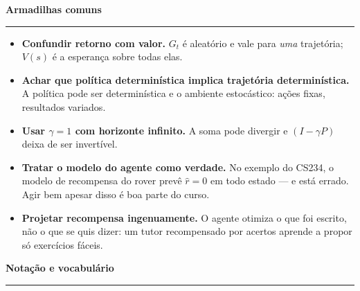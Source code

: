 \documentclass[10pt, a4paper]{article}
\newcounter{secao}
\newcommand{\secao}[1]{%
  \stepcounter{secao}%
  \vspace{0.7em}%
  \noindent{\color{rlLaranja}\rule{1.6em}{2pt}}\hspace{0.5em}%
  {\color{rlCinza}\footnotesize\bfseries\thesecao}\hspace{0.35em}%
  {\color{rlAzul}\large\bfseries #1}%
  \par\vspace{-0.15em}%
  {\color{rlAzul!22}\rule{\linewidth}{0.6pt}}%
  \par\vspace{0.25em}}
\begin{document}
\secao{Armadilhas comuns}

\begin{alertabox}
\begin{itemize}[leftmargin=1.1em, itemsep=0.25ex, topsep=0.2ex, parsep=0pt]
  \item \textbf{Confundir retorno com valor.} $G_t$ é aleatório e vale para
        \emph{uma} trajetória; $V(s)$ é a esperança sobre todas elas.
  \item \textbf{Achar que política determinística implica trajetória
        determinística.} A política pode ser determinística e o ambiente
        estocástico: ações fixas, resultados variados.
  \item \textbf{Usar $\gamma = 1$ com horizonte infinito.} A soma pode
        divergir e $(I - \gamma P)$ deixa de ser invertível.
  \item \textbf{Tratar o modelo do agente como verdade.} No exemplo do CS234,
        o modelo de recompensa do rover prevê $\hat r = 0$ em todo estado — e
        está errado. Agir bem apesar disso é boa parte do curso.
  \item \textbf{Projetar recompensa ingenuamente.} O agente otimiza o que foi
        escrito, não o que se quis dizer: um tutor recompensado por acertos
        aprende a propor só exercícios fáceis.
\end{itemize}
\end{alertabox}

\secao{Notação e vocabulário}
\end{document}
